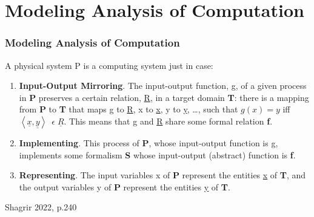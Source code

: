 \documentclass{beamer}
\begin{document}

\section{Modeling Analysis of Computation}
\begin{frame}
\frametitle{\textbf{Modeling Analysis of Computation} }

A physical system P is a computing system just in case:

\begin{enumerate}
    \item \textbf{Input-Output Mirroring}. The input-output function, g, of a given process in \textbf{P} preserves a certain relation, \underline{R}, in a target domain \textbf{T}: there is a mapping from \textbf{P} to \textbf{T} that maps g to \underline{R}, x to \underline{x}, y to \underline{y}, \dots , such that $g(x) = y$ iff $\left\langle \underline{x},\underline{y} \right\rangle\ \; \epsilon \; \underline{R}$. This means that g and \underline{R} share some formal relation \textbf{f}.
    \item \textbf{Implementing}. This process of \textbf{P}, whose input-output function is g, implements some formalism \textbf{S} whose input-output (abstract) function is \textbf{f}.
    \item \textbf{Representing}. The input variables x of \textbf{P} represent the entities \underline{x} of \textbf{T}, and the output variables y of \textbf{P} represent the entities \underline{y} of \textbf{T}.
\end{enumerate}

Shagrir 2022, p.240


\end{frame}
\end{document}
